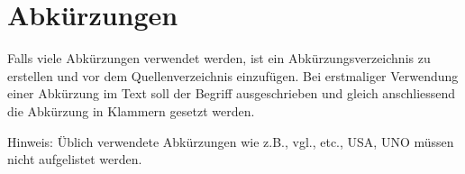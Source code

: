 \part{Abkürzungen}
Falls viele Abkürzungen verwendet werden, ist ein Abkürzungsverzeichnis zu erstellen und vor dem Quellenverzeichnis einzufügen. Bei erstmaliger Verwendung einer Abkürzung im Text soll der Begriff ausgeschrieben und gleich anschliessend die Abkürzung in Klammern gesetzt werden. 

Hinweis: 
Üblich verwendete Abkürzungen wie z.B., vgl., etc., USA, UNO müssen nicht aufgelistet werden.